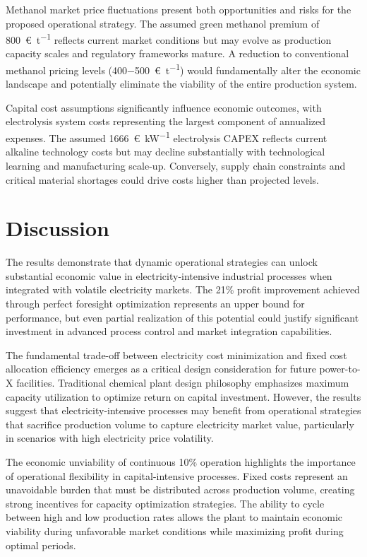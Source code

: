 \documentclass[12pt,a4paper]{article}
\begin{document}
Methanol market price fluctuations present both opportunities and risks for the proposed operational strategy. The assumed green methanol premium of \SI{800}{\euro\per\tonne} reflects current market conditions but may evolve as production capacity scales and regulatory frameworks mature. A reduction to conventional methanol pricing levels (\SI{400-500}{\euro\per\tonne}) would fundamentally alter the economic landscape and potentially eliminate the viability of the entire production system.

Capital cost assumptions significantly influence economic outcomes, with electrolysis system costs representing the largest component of annualized expenses. The assumed \SI{1666}{\euro\per\kW} electrolysis CAPEX reflects current alkaline technology costs but may decline substantially with technological learning and manufacturing scale-up. Conversely, supply chain constraints and critical material shortages could drive costs higher than projected levels.

\section{Discussion}

The results demonstrate that dynamic operational strategies can unlock substantial economic value in electricity-intensive industrial processes when integrated with volatile electricity markets. The 21\% profit improvement achieved through perfect foresight optimization represents an upper bound for performance, but even partial realization of this potential could justify significant investment in advanced process control and market integration capabilities.

The fundamental trade-off between electricity cost minimization and fixed cost allocation efficiency emerges as a critical design consideration for future power-to-X facilities. Traditional chemical plant design philosophy emphasizes maximum capacity utilization to optimize return on capital investment. However, the results suggest that electricity-intensive processes may benefit from operational strategies that sacrifice production volume to capture electricity market value, particularly in scenarios with high electricity price volatility.

The economic unviability of continuous 10\% operation highlights the importance of operational flexibility in capital-intensive processes. Fixed costs represent an unavoidable burden that must be distributed across production volume, creating strong incentives for capacity optimization strategies. The ability to cycle between high and low production rates allows the plant to maintain economic viability during unfavorable market conditions while maximizing profit during optimal periods.
\end{document}
